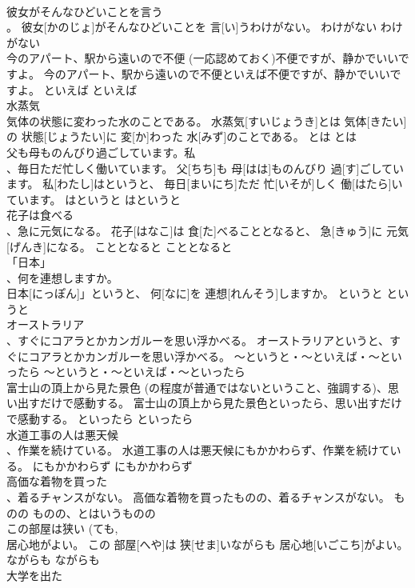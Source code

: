 \documentclass[8pt]{extreport}
\begin{document}
\begin{CJK}{UTF8}{min}
\\	彼女がそんなひどいことを言う 
\\	。	彼女[かのじょ]がそんなひどいことを 言[い]うわけがない。	わけがない	わけがない	
\\	今のアパート、駅から遠いので不便 (一応認めておく)不便ですが、静かでいいですよ。	今のアパート、駅から遠いので不便といえば不便ですが、静かでいいですよ。	といえば	といえば	
\\	水蒸気 
\\	気体の状態に変わった水のことである。	水蒸気[すいじょうき]とは 気体[きたい]の 状態[じょうたい]に 変[か]わった 水[みず]のことである。	とは	とは	
\\	父も母ものんびり過ごしています。私 
\\	、毎日ただ忙しく働いています。	父[ちち]も 母[はは]ものんびり 過[す]ごしています。 私[わたし]はというと、 毎日[まいにち]ただ 忙[いそが]しく 働[はたら]いています。	はというと	はというと	
\\	花子は食べる 
\\	、急に元気になる。	花子[はなこ]は 食[た]べることとなると、 急[きゅう]に 元気[げんき]になる。	こととなると	こととなると	
\\	「日本」
\\	、何を連想しますか。	
\\	日本[にっぽん]」というと、 何[なに]を 連想[れんそう]しますか。	というと	というと	
\\	オーストラリア 
\\	、すぐにコアラとかカンガルーを思い浮かべる。	オーストラリアというと、すぐにコアラとかカンガルーを思い浮かべる。	～というと・～といえば・～といったら	～というと・～といえば・～といったら	
\\	富士山の頂上から見た景色 (の程度が普通ではないということ、強調する)、思い出すだけで感動する。	富士山の頂上から見た景色といったら、思い出すだけで感動する。	といったら	といったら	
\\	水道工事の人は悪天候 
\\	、作業を続けている。	水道工事の人は悪天候にもかかわらず、作業を続けている。	にもかかわらず	にもかかわらず	
\\	高価な着物を買った 
\\	、着るチャンスがない。	高価な着物を買ったものの、着るチャンスがない。	ものの	ものの、とはいうものの	
\\	この部屋は狭い (ても, 
\\	居心地がよい。	この 部屋[へや]は 狭[せま]いながらも 居心地[いごこち]がよい。	ながらも	ながらも	
\\	大学を出た 

\end{CJK}
\end{document}
